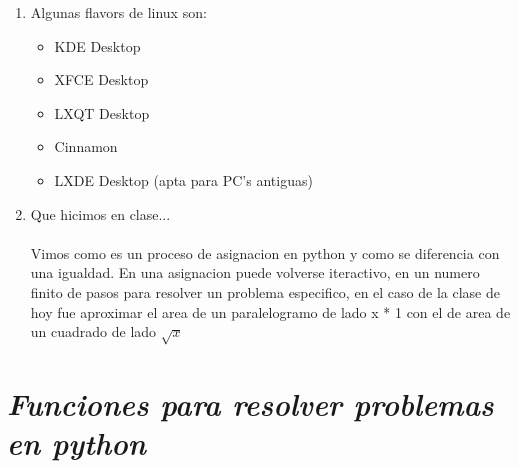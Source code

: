 \documentclass{book}
\begin{document}
\begin{enumerate}
\begin{itemize}
		
		
	\end{itemize}%
	\item Algunas flavors de linux son:
	\begin{itemize}
		\item KDE Desktop
		\item XFCE Desktop
		\item LXQT Desktop
		\item Cinnamon
		\item LXDE Desktop (apta para PC's antiguas)
	\end{itemize}
	\item Que hicimos en clase... \\
	\\
	Vimos como es un proceso de asignacion en python y como se diferencia con una igualdad. En una asignacion puede volverse iteractivo, en un numero finito de pasos para resolver un problema especifico, en el caso de la clase de hoy fue aproximar el area de un paralelogramo de lado x * 1 con el de area de un cuadrado de lado $\sqrt{x}$
	
		
	
\end{enumerate}%




\section{\textit{Funciones para resolver problemas en python}}%
\begin{flushright}
	\date{15 de enero de 2019}
\end{flushright}
\end{document}
